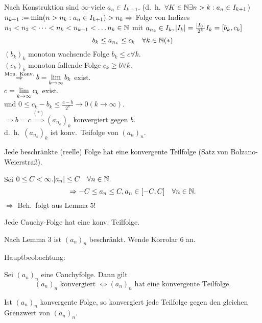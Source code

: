 \documentclass[../ana1.tex]{subfiles}
\begin{document}
\begin{bew}
	Nach Konstruktion sind \(\infty \)-viele \(a_n\in I_{k+1} \). (d.\ h.\  \(\forall K\in\mathbb{N} \exists n>k:a_n\in I_{k+1} \))\\
	\( n_{k+1} := \min (n>n_k: a_n \in I_{k+1}) > n_k\\
	\Rightarrow \) Folge von Indizes \(n_1 <n_2<\cdots<n_k<n_{k+1}<\ldots \\
	n_k\in\mathbb{N} \) mit \( a_{n_k} \in I_k, |I_k| = \frac{|I_0|}{2^k}\\
	I_k = [b_k, c_k] \)
	\[b_k \leq a_{n_k} \leq c_k \quad \forall k\in\mathbb{N} (*) \]
	\( {(b_k)}_k \) monoton wachsende Folge \(b_k\leq c \forall k \).\\
	\( {(c_k)}_k \) monoton fallende Folge \( c_k \geq b \forall k \).\\
	\( \overset{\text{Mon. Konv.}}{\Rightarrow} \\b= \lim\limits_{k\rightarrow\infty} b_k \) exist.\\
	\(c = \lim\limits_{k\rightarrow\infty} c_k \) exist.\\
	und \(0 \leq c_k - b_k \leq \frac{c-b}{2^k} \rightarrow0 (k\rightarrow\infty) \).\\
	\(\Rightarrow b=c \overset{(*)}{\Rightarrow} {(a_{n_k})}_k \) konvergiert gegen \(b\).\\
	d.\ h.\  \( {(a_{n_k})}_k \) ist konv.\ Teifolge von \( {(a_n)}_n \).
\end{bew}
\begin{kor}
	Jede beschränkte (reelle) Folge hat eine konvergente Teilfolge (Satz von Bolzano-Weierstraß).
\end{kor}
\begin{bew}
	Sei \( 0\leq C < \infty. |a_n| \leq C \quad\forall n\in\mathbb{N}. \) \\
	\[ \Rightarrow -C \leq a_n \leq C, a_n \in [-C, C] \quad\forall n\in\mathbb{N}. \]
	\( \Rightarrow \) Beh.\ folgt aus Lemma 5!
\end{bew}
\begin{kor}
	Jede Cauchy-Folge hat eine konv. Teilfolge.
\end{kor}
\begin{bew}
	Nach Lemma 3 ist \( {(a_n)}_n \) beschränkt. Wende Korrolar 6 an.
\end{bew}
Hauptbeobachtung:
\begin{lem}
	Sei \({(a_n)}_n\) eine Cauchyfolge. Dann gilt
	\[ {(a_n)}_n \text{ konvergiert } \Leftrightarrow {(a_n)}_n \text{ hat eine konvergente Teilfolge.} \]
\end{lem}
\begin{bem}
	Ist \( {(a_n)}_n \) konvergente Folge, so konvergiert jede Teilfolge gegen den gleichen Grenzwert von \({(a_n)}_n\).
\end{bem}
\end{document}
